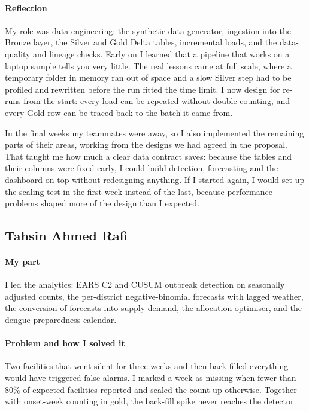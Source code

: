 \paragraph*{Reflection} My role was data engineering: the synthetic data generator, ingestion into the Bronze layer, the Silver and Gold
Delta tables, incremental loads, and the data-quality and lineage checks. Early on I learned that a pipeline that
works on a laptop sample tells you very little. The real lessons came at full scale, where a temporary folder in
memory ran out of space and a slow Silver step had to be profiled and rewritten before the run fitted the time
limit. I now design for re-runs from the start: every load can be repeated without double-counting, and every Gold
row can be traced back to the batch it came from.

In the final weeks my teammates were away, so I also implemented the remaining parts of their areas, working from
the designs we had agreed in the proposal. That taught me how much a clear data contract saves: because the
tables and their columns were fixed early, I could build detection, forecasting and the dashboard on top without
redesigning anything. If I started again, I would set up the scaling test in the first week instead of the last,
because performance problems shaped more of the design than I expected.

\subsection*{Tahsin Ahmed Rafi}
\paragraph*{My part} I led the analytics: EARS C2 and CUSUM outbreak detection on seasonally adjusted counts,
the per-district negative-binomial forecasts with lagged weather, the conversion of forecasts into supply demand,
the allocation optimiser, and the dengue preparedness calendar.

\paragraph*{Problem and how I solved it} Two facilities that went silent for three weeks and then back-filled
everything would have triggered false alarms. I marked a week as missing when fewer than 80\% of expected
facilities reported and scaled the count up otherwise. Together with onset-week counting in gold, the back-fill
spike never reaches the detector.

